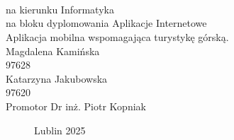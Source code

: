 \documentclass[12pt,a4paper]{article}
\def\blankpage{%
      \clearpage%
      \thispagestyle{empty}%
      \null%
      \clearpage}
\newcommand{\newCharapter}[1]{\newpage }
\begin{document}

\begin{titlepage}

    \titlepagefont
     \\
    \vspace{4cm}
    \break
    \fontsize{1.4cm}{1.4cm} \\
    \fontsize{1.4cm}{1.4cm} \\
    \vspace{0.5cm}
    \break
    \normalsize{} na kierunku Informatyka \\
    na bloku dyplomowania Aplikacje Internetowe \\
    \vspace{1cm}
    \break
    \large
    Aplikacja mobilna wspomagająca turystykę górską. \\
    \vspace{1.5cm}
    \break
    Magdalena Kamińska \\
    97628   \\
    \vspace{0.5cm}
    \break
    Katarzyna Jakubowska \\
    97620   \\
    \vspace{1.5cm}
    \break
    \normalsize{}
    Promotor Dr inż. Piotr Kopniak
    \vspace*{\fill}
    \vspace{0.5cm}
    \begin{figure}[bbp]
        {\titlepagefont Lublin 2025}
    \end{figure}
\end{titlepage}
\newpage

\onehalfspacing
\blankpage

\tableofcontents
\newCharapter{chapters/chapter0}
\setcounter{figure}{0}
\newCharapter{chapters/chapter1}
\setcounter{figure}{0}
\newCharapter{chapters/chapter2}
\setcounter{figure}{0}
\newCharapter{chapters/chapter3}
\setcounter{figure}{0}
\newCharapter{chapters/chapter4}
\setcounter{figure}{0}
\newCharapter{chapters/chapter5}
\setcounter{figure}{0}
\newCharapter{chapters/chapter6}
\setcounter{figure}{0}
\newCharapter{chapters/testy}
\setcounter{figure}{0}
\newCharapter{chapters/chapter7}


\printbibliography[type=book, title={Źródła naukowe}]
\printbibliography[type=online,title={Źródła internetowe}]
\end{document}

